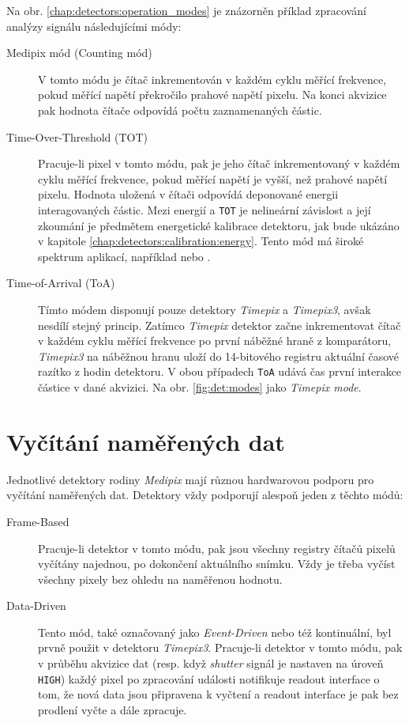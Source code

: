 Na obr. \ref{chap:detectors:operation_modes} je znázorněn příklad zpracování analýzy signálu následujícími módy:
\begin{description}
    \item[Medipix mód (Counting mód)] V tomto módu je čítač inkrementován v každém cyklu měřící frekvence, pokud měřící napětí překročilo prahové napětí pixelu. Na konci akvizice pak hodnota čítače odpovídá počtu zaznamenaných částic.
    \item[Time-Over-Threshold (TOT)] Pracuje-li pixel v tomto módu, pak je jeho čítač inkrementovaný v každém cyklu měřící frekvence, pokud měřící napětí je vyšší, než prahové napětí pixelu. Hodnota uložená v čítači odpovídá deponované energii interagovaných částic. Mezi energií a \texttt{TOT} je nelineární závislost a její zkoumání je předmětem energetické kalibrace detektoru, jak bude ukázáno v kapitole \ref{chap:detectors:calibration:energy}. Tento mód má široké spektrum aplikací, například \cite{tot_app_counting} nebo \cite{tpx_app_radiotherapy}.
    \item[Time-of-Arrival (ToA)] Tímto módem disponují pouze detektory \textit{Timepix} a \textit{Timepix3}, avšak nesdílí stejný princip. Zatímco \textit{Timepix} detektor začne inkrementovat čítač v každém cyklu měřící frekvence po první náběžné hraně z komparátoru, \textit{Timepix3} na náběžnou hranu uloží do 14-bitového registru aktuální časové razítko z hodin detektoru. V obou případech \texttt{ToA} udává čas první interakce částice v dané akvizici. Na obr. \ref{fig:det:modes} jako \textit{Timepix mode}.
\end{description}

\section{Vyčítání naměřených dat}\label{chap:detectors:readout}
Jednotlivé detektory rodiny \textit{Medipix} mají různou hardwarovou podporu pro vyčítání naměřených dat. Detektory vždy podporují alespoň jeden z těchto módů:
\begin{description}
	\item[Frame-Based] Pracuje-li detektor v tomto módu, pak jsou všechny registry čítačů pixelů vyčítány najednou, po dokončení aktuálního snímku. Vždy je třeba vyčíst všechny pixely bez ohledu na naměřenou hodnotu.
	\item[Data-Driven] Tento mód, také označovaný jako \textit{Event-Driven} nebo též kontinuální, byl prvně použit v detektoru \textit{Timepix3}. Pracuje-li detektor v tomto módu, pak v průběhu akvizice dat (resp. když \textit{shutter} signál je nastaven na úroveň \texttt{HIGH}) každý pixel po zpracování události notifikuje readout interface o tom, že nová data jsou připravena k vyčtení a readout interface je pak bez prodlení vyčte a dále zpracuje.
\end{description}

